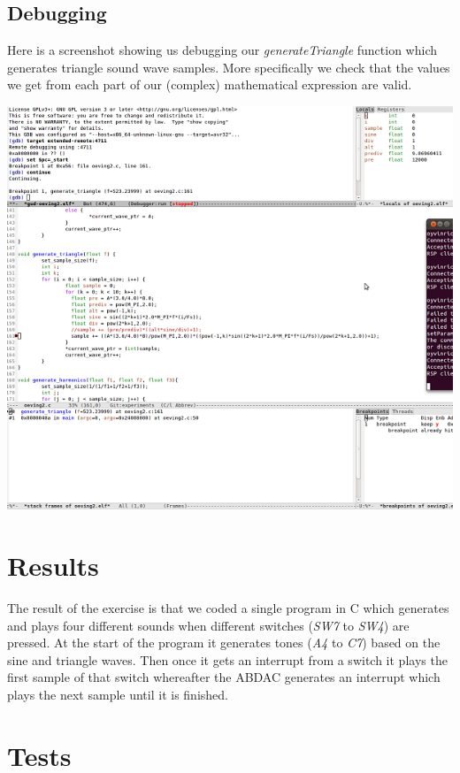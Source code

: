 \documentclass[a4paper,11pt]{article}
\begin{document}
\newpage

\subsection*{Debugging}
Here is a screenshot showing us debugging our \emph{generateTriangle} function which generates triangle sound wave samples. More specifically we check that the values we get from each part of our (complex) mathematical expression are valid. 
\begin{center}
\includegraphics[scale=1]{images/debugsmall.png}
\end{center}

\section{Results}
The result of the exercise is that we coded a single program in C which generates and plays four different sounds when different switches (\emph{SW7} to \emph{SW4}) are pressed. At the start of the program it generates tones (\emph{A4} to \emph{C7}) based on the sine and triangle waves. Then once it gets an interrupt from a switch it plays the first sample of that switch whereafter the ABDAC generates an interrupt which plays the next sample until it is finished.

\section{Tests}
\end{document}
